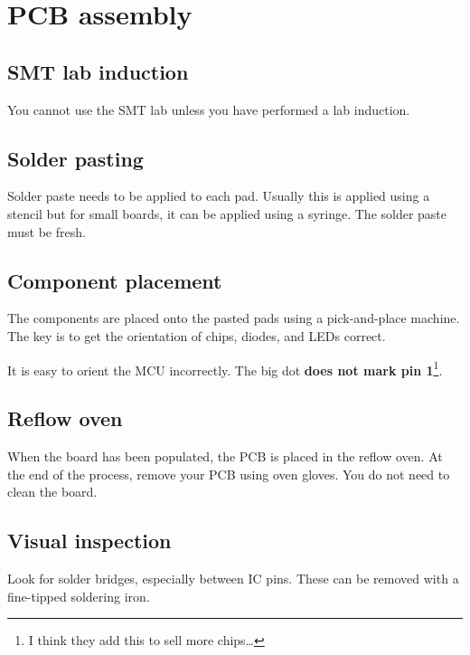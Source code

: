 \chapter{PCB assembly}


\section{SMT lab induction}

You cannot use the SMT lab unless you have performed a lab induction.


\section{Solder pasting}

Solder paste needs to be applied to each pad.  Usually this is applied
using a stencil but for small boards, it can be applied using a
syringe.  The solder paste must be fresh.


\section{Component placement}

The components are placed onto the pasted pads using a pick-and-place
machine.  The key is to get the orientation of chips, diodes, and LEDs
correct.

It is easy to orient the MCU incorrectly.  The big dot \textbf{does
  not mark pin 1}\footnote{I think they add this to sell more chips\ldots}.




\section{Reflow oven}

When the board has been populated, the PCB is placed in the reflow
oven.  At the end of the process, remove your PCB using oven gloves.
You do not need to clean the board.


\section{Visual inspection}

Look for solder bridges, especially between IC pins.  These can be
removed with a fine-tipped soldering iron.

